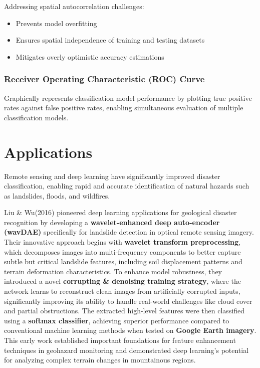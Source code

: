 \documentclass[
  letterpaper,
]{scrbook}
\begin{document}
Addressing spatial autocorrelation challenges:

\begin{itemize}
\item
  Prevents model overfitting
\item
  Ensures spatial independence of training and testing datasets
\item
  Mitigates overly optimistic accuracy estimations
\end{itemize}

\subsubsection{Receiver Operating Characteristic (ROC)
Curve}\label{receiver-operating-characteristic-roc-curve}

Graphically represents classification model performance by plotting true
positive rates against false positive rates, enabling simultaneous
evaluation of multiple classification models.

\section{Applications}\label{applications-5}

Remote sensing and deep learning have significantly improved disaster
classification, enabling rapid and accurate identification of natural
hazards such as landslides, floods, and wildfires.

Liu \& Wu(2016) pioneered deep learning applications for geological
disaster recognition by developing a \textbf{wavelet-enhanced deep
auto-encoder (wavDAE)} specifically for landslide detection in optical
remote sensing imagery. Their innovative approach begins with
\textbf{wavelet transform preprocessing}, which decomposes images into
multi-frequency components to better capture subtle but critical
landslide features, including soil displacement patterns and terrain
deformation characteristics. To enhance model robustness, they
introduced a novel \textbf{corrupting \& denoising training strategy},
where the network learns to reconstruct clean images from artificially
corrupted inputs, significantly improving its ability to handle
real-world challenges like cloud cover and partial obstructions. The
extracted high-level features were then classified using a
\textbf{softmax classifier}, achieving superior performance compared to
conventional machine learning methods when tested on \textbf{Google
Earth imagery}. This early work established important foundations for
feature enhancement techniques in geohazard monitoring and demonstrated
deep learning's potential for analyzing complex terrain changes in
mountainous regions.
\end{document}
